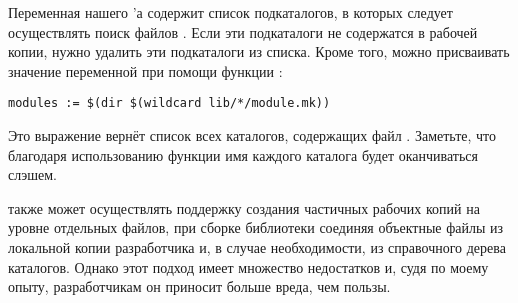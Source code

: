 Переменная  нашего \Makefile{}'а содержит список
подкаталогов, в которых следует осуществлять поиск файлов
. Если эти подкаталоги не содержатся в рабочей
копии, нужно удалить эти подкаталоги из списка. Кроме того, можно
присваивать значение переменной  при помощи функции 
:

{\footnotesize
\begin{verbatim}
modules := $(dir $(wildcard lib/*/module.mk))
\end{verbatim}
}

Это выражение вернёт список всех каталогов, содержащих файл
. Заметьте, что благодаря использованию функции
 имя каждого каталога будет оканчиваться слэшем.

\GNUmake{} также может осуществлять поддержку создания частичных
рабочих копий на уровне отдельных файлов, при сборке библиотеки
соединяя объектные файлы из локальной копии разработчика и, в случае
необходимости, из справочного дерева каталогов. Однако этот подход
имеет множество недостатков и, судя по моему опыту, разработчикам он
приносит больше вреда, чем пользы.
